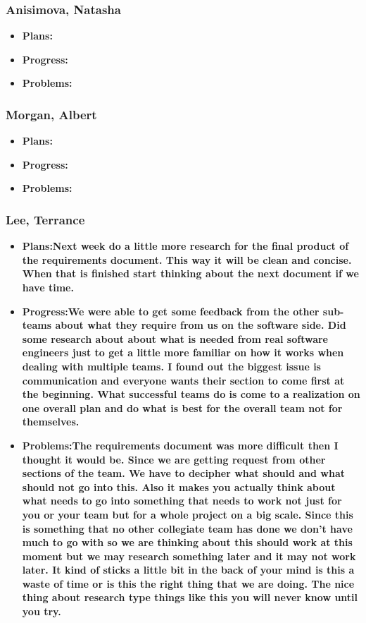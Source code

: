 \documentclass[10pt,draftclsnofoot,onecolumn]{IEEEtran}
\begin{document}
\subsubsection{Anisimova, Natasha}
\begin{itemize}
	\item \textbf{Plans:}
	\item \textbf{Progress:}
	\item \textbf{Problems:}
\end{itemize}
\subsubsection{Morgan, Albert}
\begin{itemize}
	\item \textbf{Plans:}
	\item \textbf{Progress:}
	\item \textbf{Problems:}
\end{itemize}
\subsubsection{Lee, Terrance}
\begin{itemize}
	\item \textbf{Plans:Next week do a little more research for the final product of the requirements document. This way it will be clean and concise. When that is finished start thinking about the next document if we have time.}
	\item \textbf{Progress:We were able to get some feedback from the other sub-teams about what they require from us on the software side. Did some research about about what is needed from real software engineers just to get a little more familiar on how it works when dealing with multiple teams. I found out the biggest issue is communication and everyone wants their section to come first at the beginning. What successful teams do is come to a realization on one overall plan and do what is best for the overall team not for themselves.}
	\item \textbf{Problems:The requirements document was more difficult then I thought it would be. Since we are getting request from other sections of the team. We have to decipher what should and what should not go into this. Also it makes you actually think about what needs to go into something that needs to work not just for you or your team but for a whole project on a big scale. Since this is something that no other collegiate team has done we don't have much to go with so we are thinking about this should work at this moment but we may research something later and it may not work later. It kind of sticks a little bit in the back of your mind is this a waste of time or is this the right thing that we are doing. The nice thing about research type things like this you will never know until you try.}
\end{itemize}
\end{document}
